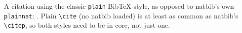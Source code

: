\documentclass{article}
\begin{document}
A citation using the classic \texttt{plain} BibTeX style, as opposed to natbib's own
\texttt{plainnat}: \cite{knuth1984}. Plain \texttt{\textbackslash cite} (no natbib
loaded) is at least as common as natbib's \texttt{\textbackslash citep}, so both
styles need to be in core, not just one.



\end{document}
